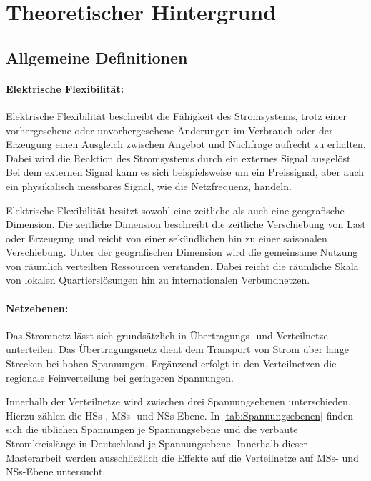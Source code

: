 \section{Theoretischer Hintergrund}

\subsection{Allgemeine Definitionen}

\paragraph{Elektrische Flexibilität:}

Elektrische Flexibilität beschreibt die Fähigkeit des Stromsystems, trotz einer vorhergesehene oder unvorhergesehene Änderungen im Verbrauch oder der Erzeugung einen Ausgleich zwischen Angebot und Nachfrage aufrecht zu erhalten.
Dabei wird die Reaktion des Stromsystems durch ein externes Signal ausgelöst.
Bei dem externen Signal kann es sich beispielsweise um ein Preissignal, aber auch ein physikalisch messbares Signal, wie die Netzfrequenz, handeln. \medskip

Elektrische Flexibilität besitzt sowohl eine zeitliche als auch eine geografische Dimension.
Die zeitliche Dimension beschreibt die zeitliche Verschiebung von Last oder Erzeugung und reicht von einer sekündlichen hin zu einer saisonalen Verschiebung.
Unter der geografischen Dimension wird die gemeinsame Nutzung von räumlich verteilten Ressourcen verstanden.
Dabei reicht die räumliche Skala von lokalen Quartierslösungen hin zu internationalen Verbundnetzen. \cite{BNetzA2017} \cite{IEA2014}


\paragraph{Netzebenen:}

Das Stromnetz lässt sich grundsätzlich in Übertragungs- und Verteilnetze unterteilen.
Das Übertragungsnetz dient dem Transport von Strom über lange Strecken bei hohen Spannungen.
Ergänzend erfolgt in den Verteilnetzen die regionale Feinverteilung bei geringeren Spannungen. \cite{Agora2019}\medskip

Innerhalb der Verteilnetze wird zwischen drei Spannungsebenen unterschieden. Hierzu zählen die \glspl{HS}-, \glspl{MS}- und \glspl{NS}-Ebene.
In \autoref{tab:Spannungsebenen} finden sich die üblichen Spannungen je Spannungsebene und die verbaute Stromkreislänge in Deutschland je Spannungsebene.
Innerhalb dieser Masterarbeit werden ausschließlich die Effekte auf die Verteilnetze auf \glspl{MS}- und \glspl{NS}-Ebene untersucht.

